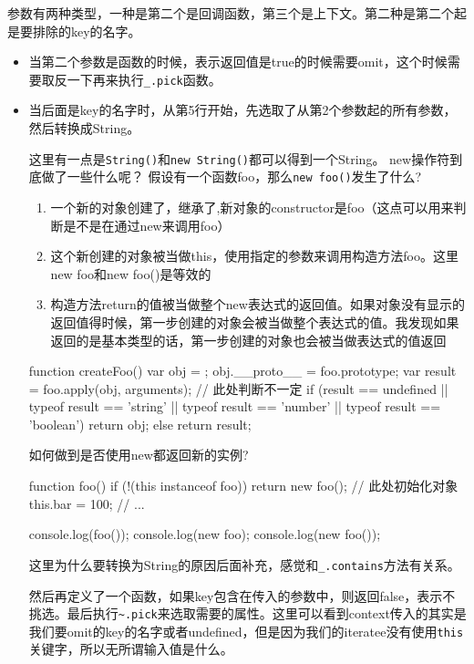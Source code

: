 参数有两种类型，一种是第二个是回调函数，第三个是上下文。第二种是第二个起是要排除的key的名字。
\begin{itemize}
\item 当第二个参数是函数的时候，表示返回值是true的时候需要omit，这个时候需要取反一下再来执行\lstinline!_.pick!函数。
\item 当后面是key的名字时，从第5行开始，先选取了从第2个参数起的所有参数，然后转换成String。

这里有一点是\lstinline!String()!和\lstinline!new String()!都可以得到一个String。
new操作符到底做了一些什么呢？
假设有一个函数foo，那么\lstinline!new foo()!发生了什么?
\begin{enumerate}
\item 一个新的对象创建了，继承了,新对象的constructor是foo（这点可以用来判断是不是在通过new来调用foo）
\item 这个新创建的对象被当做this，使用指定的参数来调用构造方法foo。这里new foo和new foo()是等效的
\item 构造方法return的值被当做整个new表达式的返回值。如果对象没有显示的返回值得时候，第一步创建的对象会被当做整个表达式的值。我发现如果返回的是基本类型的话，第一步创建的对象也会被当做表达式的值返回
\end{enumerate}
\begin{JavaScript}
function createFoo()
{
	var obj = {};
	obj.__proto__ = foo.prototype;
	var result = foo.apply(obj, arguments);
	// 此处判断不一定
	if (result == undefined || typeof result == 'string' || typeof result == 'number' || typeof result == 'boolean') 
	{
		return obj;
	} else 
	{
		return result;
	}
}
\end{JavaScript}

如何做到是否使用new都返回新的实例?
\begin{JavaScript}
function foo()
{
	if (!(this instanceof foo)) {
		return new foo();
	}
	// 此处初始化对象
	this.bar = 100;
	// ...
}

console.log(foo());
console.log(new foo);
console.log(new foo());
\end{JavaScript}

这里为什么要转换为String的原因后面补充，感觉和\lstinline!_.contains!方法有关系。

然后再定义了一个函数，如果key包含在传入的参数中，则返回false，表示不挑选。最后执行\lstinline!~.pick!来选取需要的属性。这里可以看到context传入的其实是我们要omit的key的名字或者undefined，但是因为我们的iteratee没有使用\lstinline!this!关键字，所以无所谓输入值是什么。
\end{itemize}


